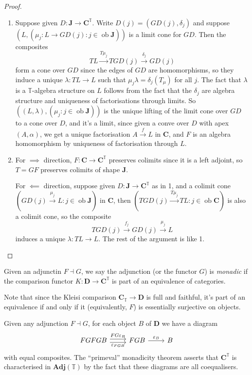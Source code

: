 \documentclass[a4paper]{article}
\renewcommand{\c}[1]{\mathbf{#1}}
\DeclareMathOperator{\ob}{ob}
\newcommand{\adjoint}{\dashv}
\newcommand{\T}{{\mathbb{T}}} %
\begin{document}
\begin{proof}\leavevmode
  \begin{enumerate}
  \item Suppose given \(D: \c J \to \c C^\T\). Write \(D(j) = (GD(j), \delta_j)\) and suppose \((L, (\mu_j: L \to GD(j): j \in \ob \c J))\) is a limit cone for \(GD\). Then the composites
    \[
      TL \xrightarrow{T\mu_j} TGD(j) \xrightarrow{\delta_j} GD(j)
    \]
    form a cone over \(GD\) since the edges of \(GD\) are homomorphisms, so they induce a unique \(\lambda: TL \to L\) such that \(\mu_j \lambda = \delta_j(T_\mu)\) for all \(j\). The fact that \(\lambda\) is a \(\T\)-algebra structure on \(L\) follows from the fact that the \(\delta_j\) are algebra structure and uniqueness of factorisations through limits. So \(((L, \lambda), (\mu_j: j \in \ob \c J))\) is the unique lifting of the limit cone over \(GD\) to a cone over \(D\), and it's a limit, since given a conve over \(D\) with apex \((A, \alpha)\), we get a unique factorisation \(A \xrightarrow{f} L\) in \(\c C\), and \(F\) is an algebra homomorphism by uniqueness of factorisation through \(L\).
  \item For \(\implies\) direction, \(F: \c C \to \c C^\T\) preserves colimits since it is a left adjoint, so \(T = GF\) preserves colimits of shape \(\c J\).

    For \(\impliedby\) direction, suppose given \(D: \c J \to \c C^\T\) as in 1, and a colimit cone \((GD(j) \xrightarrow{\mu_j} L: j \in \ob \c J)\) in \(\c C\), then \((TGD(j) \xrightarrow{T\mu_j} TL: j \in \ob \c C)\) is also a colimit cone, so the composite
    \[
      TGD(j) \xrightarrow{f_j} GD(j) \xrightarrow{\mu_j} L
    \]
    induces a unique \(\lambda: TL \to L\). The rest of the argument is like 1.
  \end{enumerate}
\end{proof}

\begin{definition}[monadicity]
  Given an adjunctin \(F \adjoint G\), we say the adjunction (or the functor \(G\)) is \emph{monadic} if the comparison functor \(K: \c D \to \c C^\T\) is part of an equivalence of categories.
\end{definition}

Note that since the Kleisi comparison \(\c C_\T \to \c D\) is full and faithful, it's part of an equivalence if and only if it (equivalently, \(F\)) is essentially surjective on objects.

\begin{remark}
  Given any adjunction \(F \adjoint G\), for each object \(B\) of \(\c D\) we have a diagram
  \[
    \begin{tikzcd}
      FGFGB \ar[r, shift left, "FG\varepsilon_B"] \ar[r, shift right, "\varepsilon_{FGB}"'] & FGB \ar[r, "\varepsilon_B"] & B
    \end{tikzcd}
  \]
  with equal composites. The ``primeval'' monadicity theorem asserts that \(\c C^\T\) is characterised in \(\c{Adj}(\T)\) by the fact that these diagrams are all coequalisers.
\end{remark}
\end{document}
